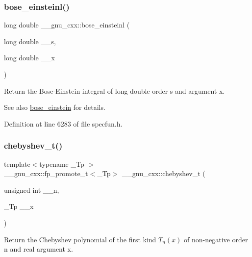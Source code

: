 \subsubsection{\texorpdfstring{bose\+\_\+einsteinl()}{bose\_einsteinl()}}
{\footnotesize\ttfamily long double \+\_\+\+\_\+gnu\+\_\+cxx\+::bose\+\_\+einsteinl (\begin{DoxyParamCaption}\item[{long double}]{\+\_\+\+\_\+s,  }\item[{long double}]{\+\_\+\+\_\+x }\end{DoxyParamCaption})\hspace{0.3cm}{\ttfamily [inline]}}

Return the Bose-\/\+Einstein integral of {\ttfamily  long double } order s and argument x.

\begin{DoxySeeAlso}{See also}
\hyperlink{group__mathsf__gnu_gae8135b6861a48f2cee2e692093a17102}{bose\+\_\+einstein} for details. 
\end{DoxySeeAlso}


Definition at line 6283 of file specfun.\+h.

\mbox{\label{group__mathsf__gnu_ga4d9cae9de13a64ceeb4fb0226f4b7844}} 
\subsubsection{\texorpdfstring{chebyshev\+\_\+t()}{chebyshev\_t()}}
{\footnotesize\ttfamily template$<$typename \+\_\+\+Tp $>$ \\
\+\_\+\+\_\+gnu\+\_\+cxx\+::fp\+\_\+promote\+\_\+t$<$\+\_\+\+Tp$>$ \+\_\+\+\_\+gnu\+\_\+cxx\+::chebyshev\+\_\+t (\begin{DoxyParamCaption}\item[{unsigned int}]{\+\_\+\+\_\+n,  }\item[{\+\_\+\+Tp}]{\+\_\+\+\_\+x }\end{DoxyParamCaption})\hspace{0.3cm}{\ttfamily [inline]}}

Return the Chebyshev polynomial of the first kind $ T_n(x) $ of non-\/negative order {\ttfamily n} and real argument {\ttfamily x}.

